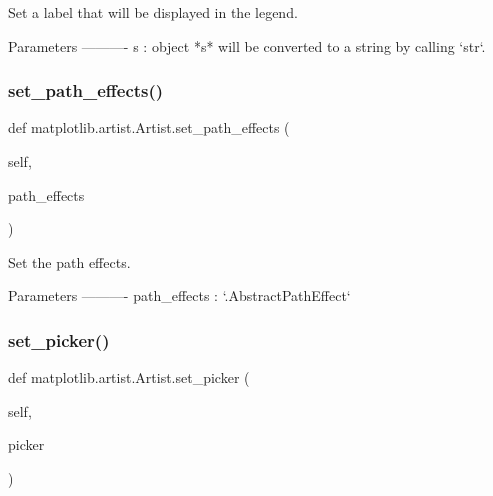 \begin{DoxyVerb}Set a label that will be displayed in the legend.

Parameters
----------
s : object
    *s* will be converted to a string by calling `str`.
\end{DoxyVerb}
 \mbox{\label{classmatplotlib_1_1artist_1_1Artist_a3493b4535ff9b0c4e94fa380b339ddca}} 
\subsubsection{\texorpdfstring{set\+\_\+path\+\_\+effects()}{set\_path\_effects()}}
{\footnotesize\ttfamily def matplotlib.\+artist.\+Artist.\+set\+\_\+path\+\_\+effects (\begin{DoxyParamCaption}\item[{}]{self,  }\item[{}]{path\+\_\+effects }\end{DoxyParamCaption})}

\begin{DoxyVerb}Set the path effects.

Parameters
----------
path_effects : `.AbstractPathEffect`
\end{DoxyVerb}
 \mbox{\label{classmatplotlib_1_1artist_1_1Artist_a6d3ce39f1c84b99e061efe1255ec75d8}} 
\subsubsection{\texorpdfstring{set\+\_\+picker()}{set\_picker()}}
{\footnotesize\ttfamily def matplotlib.\+artist.\+Artist.\+set\+\_\+picker (\begin{DoxyParamCaption}\item[{}]{self,  }\item[{}]{picker }\end{DoxyParamCaption})}

